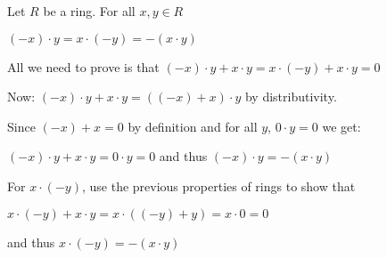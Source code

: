 \documentclass[12pt]{article}
\begin{document}
Let $R$ be a ring. For all $x,y \in R$

$(-x)\cdot y = x\cdot (-y) = -(x\cdot y)$

All we need to prove is that $(-x)\cdot y + x\cdot y = x\cdot (-y) + x\cdot y = 0$

Now: $(-x)\cdot y + x\cdot y = ((-x) + x)\cdot y$ by distributivity.

Since $(-x)+x=0$ by definition and for all $y$, $0\cdot y=0$
 we get:

$(-x)\cdot y + x\cdot y = 0\cdot y = 0$ and thus $(-x)\cdot y = - (x\cdot y)$


For $x\cdot (-y)$, use the previous properties of rings to show that

$x\cdot (-y) + x\cdot y = x\cdot ((-y) +y) = x\cdot 0 = 0$

and thus $x \cdot (-y) = - (x\cdot y)$
\end{document}
